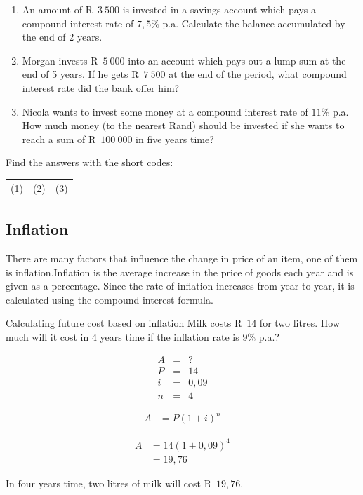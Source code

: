 \begin{exercises}{}{
    \begin{enumerate}[label=\textbf{\arabic*}.]
	\item An amount of R~$3~500$ is invested in a savings account which pays a compound interest rate of $7,5\%$ p.a. Calculate the balance accumulated by the end of 2 years.

	\item Morgan invests R~$5~000$ into an account which pays out a lump sum at the end of 5 years. If he gets R~$7~500$ at the end of the period, what compound interest rate did the bank offer him?

	\item Nicola wants to invest some money at a compound interest rate of $11\%$ p.a. How much money (to the nearest Rand) should be invested if she wants to reach a sum of R~$100~000$ in five years time?\\
    \end{enumerate}

    Find the answers with the short codes:\\
    \begin{tabularx}{\textwidth}{ XXX }
	(1)	&	(2)	&	(3)\\
    \end{tabularx}
}
\end{exercises}


\subsection{Inflation}

There are many factors that influence the change in price of an item, one of them is inflation.Inflation is the average increase in the price of goods each year and is given as a percentage. Since the rate of inflation increases from year to year, it is calculated using the compound interest formula.


\begin{wex}{Calculating future cost based on inflation}
    {Milk costs R~$14$ for two litres. How much will it cost in 4 years time if the inflation rate is $9\%$ p.a.?}{
    
    \begin{eqnarray*}
	A &=& ?\\
	P &=& 14\\
	i &=& 0,09\\
	n &=& 4
    \end{eqnarray*}

    \begin{align*}
	A &= P(1 + i)^n
    \end{align*}

    \begin{align*}
	A &= 14(1 + 0,09)^4\\
	  &= 19,76
    \end{align*}

    In four years time, two litres of milk will cost R~$19,76$.
    }
\end{wex}


